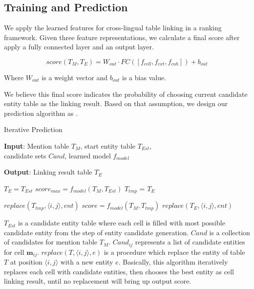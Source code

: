 \subsection{Training and Prediction}
\label{sec:strategy}

We apply the learned features for cross-lingual table linking in a ranking framework. Given three feature representations, we calculate a final score after apply a fully connected layer and an output layer. 

\begin{equation}
\label{eqn:score}
score(T_M, T_E) = W_{out} \cdot FC([f_{cell}, f_{cxt}, f_{coh}]) + b_{out}
\end{equation}

Where $W_{out}$ is a weight vector and $b_{out}$ is a bias value.

We believe this final score indicates the probability of choosing current candidate entity table as the linking result. Based on that assumption, we design our prediction algorithm as .

\begin{algorithm}
	\small
	\caption{Iterative Prediction}
	\label{alg:prediction}
	\textbf{Input}: Mention table $T_M$, start entity table $T_{Est}$, \\
	candidate sets $Cand$, learned model $f_{model}$
	
	\textbf{Output}: Linking result table $T_E$
	\begin{algorithmic}[1]
		\State $T_E = T_{Est}$
		\State $score_{max} = f_{model}(T_M, T_{Est})$
		\Repeat
		\State $T_{tmp}$ = $T_E$
		
		\State $replace(T_{tmp}, \langle i,j\rangle, ent)$
		\State $score =f_{model}(T_M, T_{tmp})$
		\State $replace(T_E, \langle i,j\rangle, ent)$
		\EndIf
		\EndFor
		\EndFor
		
		\EndProcedure
	\end{algorithmic}
\end{algorithm}

$T_{Est}$ is a candidate entity table where each cell is filled with most possible candidate entity from the step of entity candidate generation. $Cand$ is a collection of candidates for mention table $T_M$. $Cand_{ij}$ represents a list of candidate entities for cell $\textbf{m}_{ij}$. $replace(T, \langle i,j\rangle, e)$ is a procedure which replace the entity of table $T$ at position $\langle i,j\rangle$ with a new entity $e$.
Basically, this algorithm iteratively replaces each cell with candidate entities, then chooses the best entity as cell linking result, until no replacement will bring up output score.

